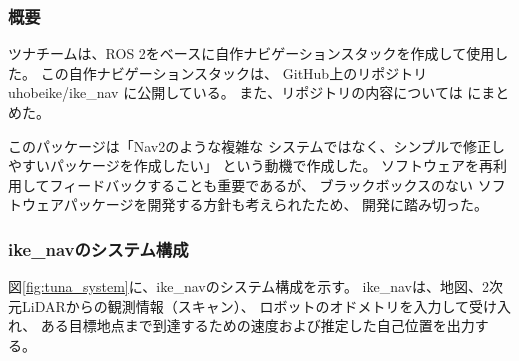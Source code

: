 \documentclass[twocolumn,9pt]{jsproceedings}
\begin{document}
\subsubsection{概要}
ツナチームは、ROS 2をベースに自作ナビゲーションスタックを作成して使用した。
この自作ナビゲーションスタックは、
GitHub上のリポジトリuhobeike/ike\_nav\cite{ike_nav}
に公開している。
また、リポジトリの内容については
\cite{ike_nav_detail}にまとめた。

このパッケージは「Nav2のような複雑な
システムではなく、シンプルで修正しやすいパッケージを作成したい」
という動機で作成した。
ソフトウェアを再利用してフィードバックすることも重要であるが、
ブラックボックスのない
ソフトウェアパッケージを開発する方針も考えられたため、
開発に踏み切った。



%


\subsubsection{ike\_navのシステム構成}

図\ref{fig:tuna_system}に、ike\_navのシステム構成を示す。
ike\_navは、地図、2次元LiDARからの観測情報（スキャン）、
ロボットのオドメトリを入力して受け入れ、
ある目標地点まで到達するための速度および推定した自己位置を出力する。
\end{document}
